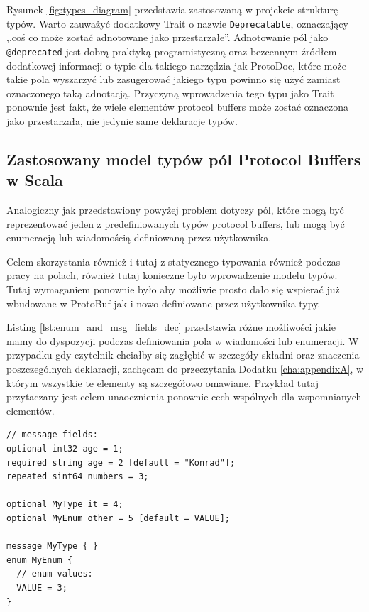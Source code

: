 \documentclass[pdflatex,11pt]{aghdpl}
\begin{document}
Rysunek \ref{fig:types_diagram} przedstawia zastosowaną w projekcie strukturę typów. Warto zauważyć dodatkowy Trait o nazwie \verb|Deprecatable|, 
oznaczający ,,coś co może zostać adnotowane jako przestarzałe''. Adnotowanie pól jako \verb|@deprecated| jest dobrą praktyką programistyczną oraz 
bezcennym źródłem dodatkowej informacji o typie dla takiego narzędzia jak ProtoDoc, które może takie pola wyszarzyć lub zasugerować jakiego typu 
powinno się użyć zamiast oznaczonego taką adnotacją. Przyczyną wprowadzenia tego typu jako Trait ponownie jest fakt, że wiele elementów protocol buffers
może zostać oznaczona jako przestarzała, nie jedynie same deklaracje typów.

\subsection{Zastosowany model typów pól Protocol Buffers w Scala}
\label{the_field_types}
Analogiczny jak przedstawiony powyżej problem dotyczy pól, które mogą być reprezentować jeden z predefiniowanych typów protocol buffers, lub
mogą być enumeracją lub wiadomością definiowaną przez użytkownika.

Celem skorzystania również i tutaj z statycznego typowania również podczas pracy na polach, również tutaj konieczne było wprowadzenie modelu typów.
Tutaj wymaganiem ponownie było aby możliwie prosto dało się wspierać już wbudowane w ProtoBuf jak i nowo definiowane przez użytkownika typy.

Listing \ref{lst:enum_and_msg_fields_dec} przedstawia różne możliwości jakie mamy do dyspozycji podczas definiowania pola w wiadomości lub enumeracji.
W przypadku gdy czytelnik chciałby się zagłębić w szczegóły składni oraz znaczenia poszczególnych deklaracji, zachęcam do przeczytania Dodatku \ref{cha:appendixA},
w którym wszystkie te elementy są szczegółowo omawiane. Przykład tutaj przytaczany jest celem unaocznienia ponownie cech wspólnych dla wspomnianych elementów.

\begin{lstlisting}[caption={Deklaracja pola w wiadomości oraz enumeracji}, label={lst:enum_and_msg_fields_dec}]
// message fields:
optional int32 age = 1;
required string age = 2 [default = "Konrad"];
repeated sint64 numbers = 3;

optional MyType it = 4;
optional MyEnum other = 5 [default = VALUE];

message MyType { }
enum MyEnum {
  // enum values:
  VALUE = 3;
}
\end{lstlisting}
\end{document}
